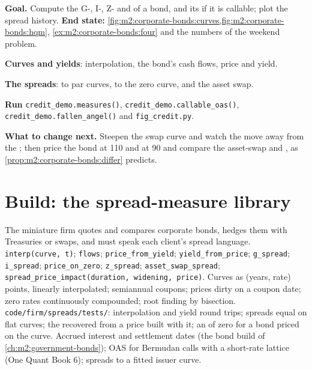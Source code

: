 \begin{tutorial}
\textbf{Goal.} Compute the G-, I-, Z- and  of a bond, and its
 if it is callable; plot the spread history.
\textbf{End state:}
\cref{fig:m2:corporate-bonds:curves,fig:m2:corporate-bonds:hqm},
\cref{ex:m2:corporate-bonds:four} and the numbers of the weekend problem.
\begin{tutsteps}
\item \textbf{Curves and yields}: interpolation, the bond's cash flows, price and
yield.
\label{lst:m2:corporate-bonds:yield}
\item \textbf{The spreads}: to par curves, to the zero curve, and the asset swap.
\label{lst:m2:corporate-bonds:spreads}
\item \textbf{Run} \texttt{credit\_demo.measures()},
\texttt{credit\_demo.callable\_oas()}, \texttt{credit\_demo.fallen\_angel()} and
\texttt{fig\_credit.py}.
\end{tutsteps}
\textbf{What to change next.} Steepen the swap curve and watch the  move
away from the ; then price the bond at 110 and at 90 and compare the
asset-swap and , as \cref{prop:m2:corporate-bonds:differ} predicts.
\end{tutorial}

\section{Build: the spread-measure library}\label{bld:m2:corporate-bonds:spreads}

\begin{build}
 The miniature firm quotes and compares corporate bonds, hedges
them with Treasuries or swaps, and must speak each client's spread language.
 \texttt{interp(curve, t)}; \texttt{flows}; \texttt{price\_from\_yield};
\texttt{yield\_from\_price}; \texttt{g\_spread}; \texttt{i\_spread};
\texttt{price\_on\_zero}; \texttt{z\_spread}; \texttt{asset\_swap\_spread};
\texttt{spread\_price\_impact(duration, widening, price)}.
 Curves as (years, rate) points, linearly interpolated; semiannual
coupons; prices dirty on a coupon date; zero rates continuously compounded; root
finding by bisection.
 \texttt{code/firm/spreads/tests/}: interpolation and yield
round trips; spreads equal on flat curves; the  recovered from a price built
with it; an  of zero for a bond priced on the curve.
 Accrued interest and settlement dates (the bond build of
\cref{ch:m2:government-bonds}); OAS for Bermudan calls with a short-rate lattice
(One Quant Book 6); spreads to a fitted issuer curve.
\end{build}

